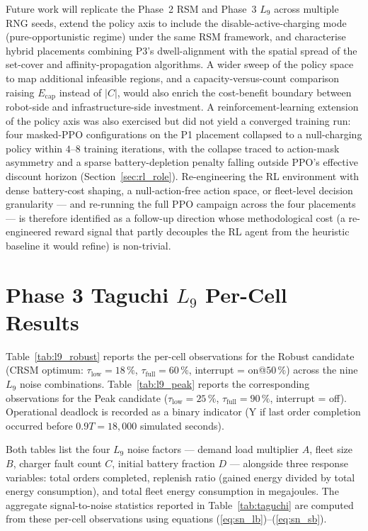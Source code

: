 \documentclass[conference]{IEEEtran}
\begin{document}
Future work will replicate the Phase~2 RSM and Phase~3 $L_9$ across multiple RNG seeds, extend the policy axis to include the disable-active-charging mode (pure-opportunistic regime) under the same RSM framework, and characterise hybrid placements combining P3's dwell-alignment with the spatial spread of the set-cover and affinity-propagation algorithms. A wider sweep of the policy space to map additional infeasible regions, and a capacity-versus-count comparison raising $E_\text{cap}$ instead of $|C|$, would also enrich the cost-benefit boundary between robot-side and infrastructure-side investment. A reinforcement-learning extension of the policy axis was also exercised but did not yield a converged training run: four masked-PPO configurations on the P1 placement collapsed to a null-charging policy within $4$--$8$ training iterations, with the collapse traced to action-mask asymmetry and a sparse battery-depletion penalty falling outside PPO's effective discount horizon (Section~\ref{sec:rl_role}). Re-engineering the RL environment with dense battery-cost shaping, a null-action-free action space, or fleet-level decision granularity --- and re-running the full PPO campaign across the four placements --- is therefore identified as a follow-up direction whose methodological cost (a re-engineered reward signal that partly decouples the RL agent from the heuristic baseline it would refine) is non-trivial.

\appendices

\section{Phase 3 Taguchi $L_9$ Per-Cell Results}
\label{app:l9}

Table~\ref{tab:l9_robust} reports the per-cell observations for the Robust candidate (CRSM optimum: $\tau_\text{low}=18\,\%$, $\tau_\text{full}=60\,\%$, interrupt = on@$50\,\%$) across the nine $L_9$ noise combinations. Table~\ref{tab:l9_peak} reports the corresponding observations for the Peak candidate ($\tau_\text{low}=25\,\%$, $\tau_\text{full}=90\,\%$, interrupt = off). Operational deadlock is recorded as a binary indicator (Y if last order completion occurred before $0.9 T = 18{,}000$ simulated seconds).

Both tables list the four $L_9$ noise factors --- demand load multiplier $A$, fleet size $B$, charger fault count $C$, initial battery fraction $D$ --- alongside three response variables: total orders completed, replenish ratio (gained energy divided by total energy consumption), and total fleet energy consumption in megajoules. The aggregate signal-to-noise statistics reported in Table~\ref{tab:taguchi} are computed from these per-cell observations using equations (\ref{eq:sn_lb})--(\ref{eq:sn_sb}).
\end{document}
